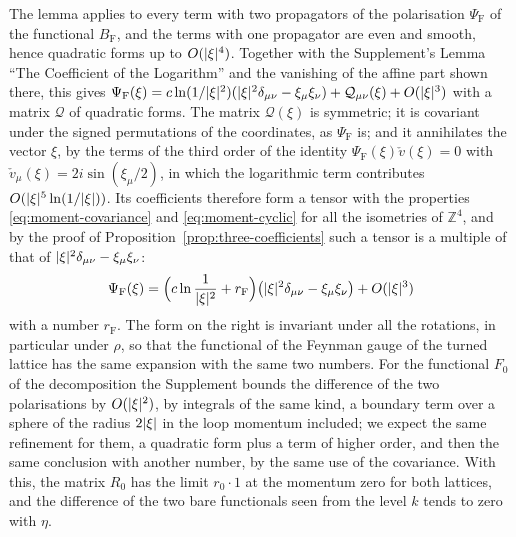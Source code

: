 \documentclass[11pt]{preprint}
\DeclarePairedDelimiter{\abs}{\lvert}{\rvert}
\numberwithin{equation}{section}
\theoremstyle{definition}
\theoremstyle{remark}
\theoremstyle{plain}
\begin{document}
The lemma applies to every term with two propagators of the polarisation $\Psi_{\mathrm F}$ of the functional $B_{\mathrm F}$, and the terms with one propagator are even and smooth, hence quadratic forms up to $O(\abs\xi^4)$. Together with the Supplement's Lemma ``The Coefficient of the Logarithm'' and the vanishing of the affine part shown there, this gives $\Psi_{\mathrm F}(\xi) = c\ln(1/\abs\xi^2)(\abs\xi^2\delta_{\mu\nu} - \xi_\mu\xi_\nu) + \mathcal Q_{\mu\nu}(\xi) + O(\abs\xi^3)$ with a matrix $\mathcal Q$ of quadratic forms. The matrix $\mathcal Q(\xi)$ is symmetric; it is covariant under the signed permutations of the coordinates, as $\Psi_{\mathrm F}$ is; and it annihilates the vector $\xi$, by the terms of the third order of the identity $\Psi_{\mathrm F}(\xi)\check v(\xi) = 0$ with $\check v_\mu(\xi) = 2i\sin(\xi_\mu/2)$, in which the logarithmic term contributes $O(\abs\xi^5\ln(1/\abs\xi))$. Its coefficients therefore form a tensor with the properties \eqref{eq:moment-covariance} and \eqref{eq:moment-cyclic} for all the isometries of $\mathbb Z^4$, and by the proof of Proposition~\ref{prop:three-coefficients} such a tensor is a multiple of that of $\abs\xi^2\delta_{\mu\nu} - \xi_\mu\xi_\nu$:
\begin{equation}\label{eq:isotropic-constant}
    \Psi_{\mathrm F}(\xi) = \Bigl(c\ln\frac{1}{\abs\xi^2} + r_{\mathrm F}\Bigr)\bigl(\abs\xi^2\delta_{\mu\nu} - \xi_\mu\xi_\nu\bigr) + O(\abs\xi^3)
\end{equation}
with a number $r_{\mathrm F}$. The form on the right is invariant under all the rotations, in particular under $\rho$, so that the functional of the Feynman gauge of the turned lattice has the same expansion with the same two numbers. For the functional $F_0$ of the decomposition the Supplement bounds the difference of the two polarisations by $O(\abs\xi^2)$, by integrals of the same kind, a boundary term over a sphere of the radius $2\abs\xi$ in the loop momentum included; we expect the same refinement for them, a quadratic form plus a term of higher order, and then the same conclusion with another number, by the same use of the covariance. With this, the matrix $R_0$ has the limit $r_0 \cdot 1$ at the momentum zero for both lattices, and the difference of the two bare functionals seen from the level $k$ tends to zero with $\eta$.
\end{document}

